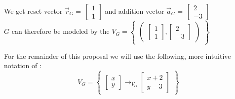 We get reset vector $
\vec{r}_G = \  
\begin{bmatrix}
	1 \\
	1 
\end{bmatrix}
$
and addition vector $
\vec{a}_G = \ 
\begin{bmatrix}
	2 \\
	-3 
\end{bmatrix}$ \\
$G$ can therefore be modeled by the \qvasr
$V_G = 
\begin{Bmatrix}
	\begin{pmatrix}
		\begin{bmatrix}
			 1 \\
			 1
		\end{bmatrix},
		\begin{bmatrix}
			2 \\
			-3
		\end{bmatrix}
	\end{pmatrix}
\end{Bmatrix}
$ \par \vspace{2pt}
For the remainder of this proposal we will use the following, more intuitive notation of \qvasr:
\begin{equation*}
V_G = 
\begin{Bmatrix}
	\begin{bmatrix}
		x \\
		y
	\end{bmatrix} \rightarrow_{V_G}
	\begin{bmatrix}
		x + 2 \\
		y - 3
	\end{bmatrix}
\end{Bmatrix}
\end{equation*}

